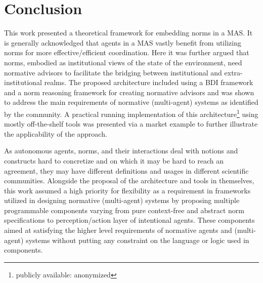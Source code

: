 

\section{Conclusion}
\label{sec:conclusion}

This work presented a theoretical framework for embedding norms in a MAS. It is generally acknowledged that agents in a MAS vastly benefit from utilizing norms for more effective/efficient coordination. Here it was further argued that norms, embodied as institutional views of the state of the environment, need normative advisors to facilitate the bridging between institutional and extra-institutional realms. The proposed architecture included using a BDI framework and a norm reasoning framework for creating normative advisors and was shown to address the main requirements of normative (multi-agent) systems as identified by the community. A practical running implementation of this architecture\footnote{publicly available: anonymized} using mostly off-the-shelf tools was presented via a market example to further illustrate the applicability of the approach.

As autonomous agents, norms, and their interactions deal with notions and constructs hard to concretize and on which it may be hard to reach an agreement, they may have different definitions and usages in different scientific communities. Alongside the proposal of the architecture and tools in themselves, this work assumed a high priority for flexibility as a requirement in frameworks utilized in designing normative (multi-agent) systems by proposing multiple programmable components varying from pure context-free and abstract norm specifications to perception/action layer of intentional agents. These components aimed at satisfying the higher level requirements of normative agents and (multi-agent) systems without putting any constraint on the language or logic used in components.



